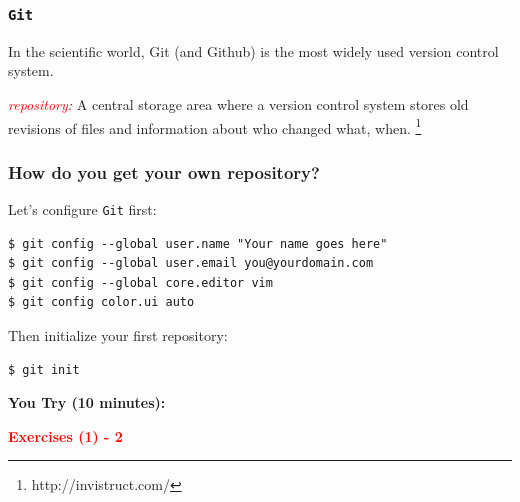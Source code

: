 \documentclass{beamer}
\begin{document}

\begin{frame}
\frametitle{\texttt{Git}}
In the scientific world, Git (and Github) is the most widely used version control system.
\begin{center}
\end{center}\pause
\textit{\textcolor{red}{repository}:} A central storage area where a version control system stores old revisions of files and information about who changed what, when.
\footnote{\footnotesize{http://invistruct.com/}}
\end{frame}

\begin{frame}[fragile]
\frametitle{How do you get your own repository?}
Let's configure \texttt{Git} first:
\begin{verbatim}
$ git config --global user.name "Your name goes here"
$ git config --global user.email you@yourdomain.com
$ git config --global core.editor vim
$ git config color.ui auto
\end{verbatim}
Then initialize your first repository:
\begin{verbatim}
$ git init
\end{verbatim}
\begin{center} \pause
\textbf{You Try (10 minutes):}

\textbf{\textcolor{red}{Exercises (1) - 2}}
\end{center}
\end{frame}
\end{document}
